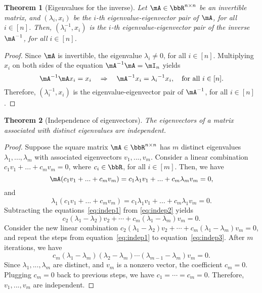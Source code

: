 \documentclass[11pt]{article}
\theoremstyle{plain}
\newtheorem{thm}{Theorem}[section]
\theoremstyle{definition}
\begin{document}
\begin{thm}[Eigenvalues for the inverse]
Let $\mA \in \bbR^{n \times n}$ be an invertible matrix, and $(\lambda_i, x_i)$ be the $i$-th eigenvalue-eigenvector pair of $\mA$, for all $i \in [n]$. Then, $(\lambda^{-1}_i, x_i)$ is the $i$-th eigenvalue-eigenvector pair of the inverse $\mA^{-1}$, for all $i \in [n]$.
\end{thm}

\begin{proof}
	Since $\mA$ is invertible, the eigenvalue $\lambda_i \neq 0$, for all $  i \in [n]$. Multiplying $x_i$ on both sides of the equation $\mA^{-1} \mA = \mI_n$ yields
	\[ \mA^{-1} \mA x_i = x_i \quad \Rightarrow\quad  \mA^{-1} x_i = {\lambda_i}^{-1} x_i, \quad \text{for all } i \in [n]. \]
Therefore, $(\lambda_i^{-1},x_i)$ is the eigenvalue-eigenvector pair of $\mA^{-1}$, for all $i \in [n]$.
\end{proof}

\begin{thm}[Independence of eigenvectors]\label{thm:indepeigen} 
 The eigenvectors of a matrix associated with distinct eigenvalues are independent.
\end{thm}

\begin{proof}
	Suppose the square matrix $\mA \in \bbR^{n \times n}$ has $m$ distinct eigenvalues $\lambda_1,...,\lambda_m$ with associated eigenvectors  $v_1,...,v_m$. Consider a linear combination $c_1 v_1 + ... + c_m v_m = 0$, where $c_i \in \bbR$, for all $i \in [m]$.	
	Then, we have
	\begin{equation}\label{eq:indep1}
		\mA(c_1 v_1 + ... + c_m v_m ) = c_1 \lambda_1 v_1 + ... + c_m \lambda_m v_m = 0,
		\end{equation}
		and
		\begin{equation}\label{eq:indep2}
		\lambda_1 (c_1 v_1 + ... + c_m v_m ) = c_1 \lambda_1 v_1 + ... + c_m \lambda_1 v_m = 0. 
	\end{equation}
	Subtracting the equations~\eqref{eq:indep1} from \eqref{eq:indep2} yields
	\begin{equation}\label{eq:indep3}
		 c_2 (\lambda_1 - \lambda_2) v_2 + \cdots + c_m (\lambda_1 - \lambda_m) v_m  = 0.
	\end{equation}
	Consider the new linear combination $ c_2 (\lambda_1 - \lambda_2) v_2 + \cdots + c_m (\lambda_1 - \lambda_m) v_m = 0$, and repeat the steps from equation~\eqref{eq:indep1} to equation~\eqref{eq:indep3}. After $m$ iterations, we have 
	\[ c_m(\lambda_1 - \lambda_m)(\lambda_2 - \lambda_m)\cdots (\lambda_{m-1} - \lambda_m) v_m = 0.    \]
	 Since $\lambda_1 ,..., \lambda_m$ are distinct, and $v_m$ is a nonzero vector, the coefficient $c_m = 0$.  Plugging $c_m = 0$ back to previous steps, we have $c_1 = \cdots = c_m = 0$. Therefore, $v_1,...,v_m$ are independent.
\end{proof}
\end{document}
